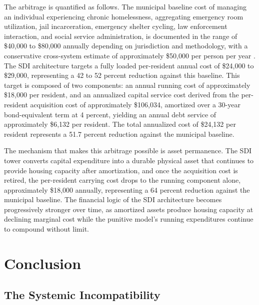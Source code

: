 \documentclass[12pt, letterpaper]{article}
\begin{document}
The arbitrage is quantified as follows. The municipal baseline cost of managing an individual experiencing chronic homelessness, aggregating emergency room utilization, jail incarceration, emergency shelter cycling, law enforcement interaction, and social service administration, is documented in the range of \$40,000 to \$80,000 annually depending on jurisdiction and methodology, with a conservative cross-system estimate of approximately \$50,000 per person per year \citep{dibella_wp1_2026}. The SDI architecture targets a fully loaded per-resident annual cost of \$24,000 to \$29,000, representing a 42 to 52 percent reduction against this baseline. This target is composed of two components: an annual running cost of approximately \$18,000 per resident, and an annualized capital service cost derived from the per-resident acquisition cost of approximately \$106,034, amortized over a 30-year bond-equivalent term at 4 percent, yielding an annual debt service of approximately \$6,132 per resident. The total annualized cost of \$24,132 per resident represents a 51.7 percent reduction against the municipal baseline.

The mechanism that makes this arbitrage possible is asset permanence. The SDI tower converts capital expenditure into a durable physical asset that continues to provide housing capacity after amortization, and once the acquisition cost is retired, the per-resident carrying cost drops to the running component alone, approximately \$18,000 annually, representing a 64 percent reduction against the municipal baseline. The financial logic of the SDI architecture becomes progressively stronger over time, as amortized assets produce housing capacity at declining marginal cost while the punitive model's running expenditures continue to compound without limit.


\section{Conclusion}

\subsection{The Systemic Incompatibility}
\end{document}
